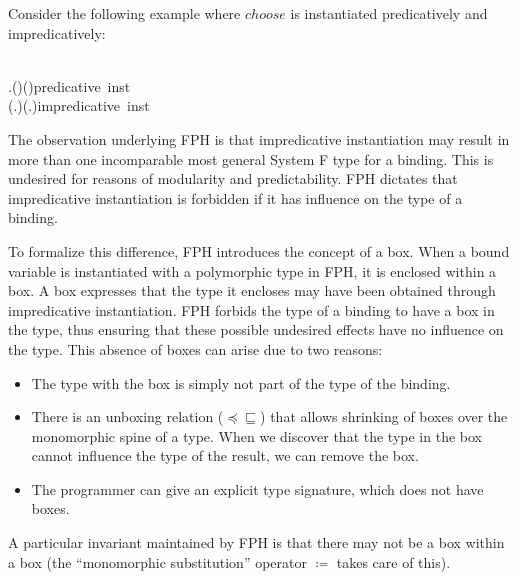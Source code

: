 \documentclass[preprint,natbib]{sigplanconf}
\newcommand{\Varid}[1]{\mathit{#1}}
\def\resethooks{%
  \global\let\SaveRestoreHook\empty
  \global\let\ColumnHook\empty}
\begin{document}
    Consider the following example where \ensuremath{\Varid{choose}} is instantiated predicatively and impredicatively:
    \begin{hscode}\SaveRestoreHook
{}
\>[7]{}\Varid{f}\mathrel{=}\Varid{choose}\;\Varid{id}{}\<[E]
\\
\>[7]{}\Varid{f}\mathbin{::}\forall\!\;\alpha\;.\;\;(\alpha\to \alpha){}\<[47]
\>[47]{}\to (\alpha\to \alpha){}\<[85]
\>[85]{}\mbox{\onelinecomment  predicative inst}{}\<[E]
\\
\>[7]{}\Varid{f}\mathbin{::}(\forall\!\;\alpha\;.\;\;\alpha\to \alpha){}\<[47]
\>[47]{}\to (\forall\!\;\alpha\;.\;\;\alpha\to \alpha){}\<[85]
\>[85]{}\mbox{\onelinecomment  impredicative inst}{}\<[E]
\ColumnHook
\end{hscode}\resethooks
    The observation underlying FPH is that impredicative instantiation may result in more than one incomparable most general System F type
    for a binding. This is undesired for reasons of modularity and predictability. FPH dictates that impredicative instantiation is forbidden
    if it has influence on the type of a binding.

    To formalize this difference, FPH introduces the concept of a box. When a bound variable is instantiated with a polymorphic type in FPH, it is enclosed
    within a box. A box expresses that the type it encloses may have been obtained through impredicative instantiation. FPH forbids the type of a
    binding to have a box in the type, thus ensuring that these possible undesired effects have no influence on the type. This absence of boxes
    can arise due to two reasons:
    \begin{itemize}
    \item The type with the box is simply not part of the type of the binding.
    \item There is an unboxing relation ($\preceq\sqsubseteq$) that allows shrinking of boxes over the monomorphic spine of a type. When we discover that
      the type in the box cannot influence the type of the result, we can remove the box.
    \item The programmer can give an explicit type signature, which does not have boxes.
    \end{itemize}
    A particular invariant maintained by FPH is that there may not be a box within a box (the ``monomorphic substitution'' operator $\coloneqq$ takes care of this).
\end{document}
